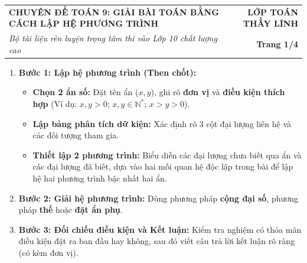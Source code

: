 \documentclass[11pt,a4paper]{article}
\begin{document}
\pagestyle{empty}

\noindent
\begin{tabularx}{\linewidth}{|X|r|}
\hline
\textbf{\color{mainblue}CHUYÊN ĐỀ TOÁN 9: GIẢI BÀI TOÁN BẰNG CÁCH LẬP HỆ PHƯƠNG TRÌNH} & \textbf{\color{darkred}LỚP TOÁN THẦY LĨNH} \\
\textit{Bộ tài liệu rèn luyện trọng tâm thi vào Lớp 10 chất lượng cao} & \textbf{Trang 1/4} \\
\hline
\end{tabularx}

\vspace{0.8mm}

\begin{khungpp}
\begin{enumerate}[leftmargin=*,itemsep=0.6pt,topsep=0pt,partopsep=0pt]
  \item \textbf{Bước 1: Lập hệ phương trình (Then chốt):}
  \begin{itemize}[leftmargin=*,itemsep=0.3pt]
    \item \textbf{Chọn 2 ẩn số:} Đặt tên ẩn ($x, y$), ghi rõ \textbf{đơn vị} và \textbf{điều kiện thích hợp} (Ví dụ: $x, y > 0$; $x, y \in \mathbb{N}^*$; $x > y > 0$).
    \item \textbf{Lập bảng phân tích dữ kiện:} Xác định rõ 3 cột đại lượng liên hệ và các đối tượng tham gia.
    \item \textbf{Thiết lập 2 phương trình:} Biểu diễn các đại lượng chưa biết qua ẩn và các đại lượng đã biết, dựa vào hai mối quan hệ độc lập trong bài để lập hệ hai phương trình bậc nhất hai ẩn.
  \end{itemize}
  \item \textbf{Bước 2: Giải hệ phương trình:} Dùng phương pháp \textbf{cộng đại số}, phương pháp \textbf{thế} hoặc \textbf{đặt ẩn phụ}.
  \item \textbf{Bước 3: Đối chiếu điều kiện và Kết luận:} Kiểm tra nghiệm có thỏa mãn điều kiện đặt ra ban đầu hay không, sau đó viết câu trả lời kết luận rõ ràng (có kèm đơn vị).
\end{enumerate}
\end{khungpp}

\vspace{0.8mm}
\end{document}
